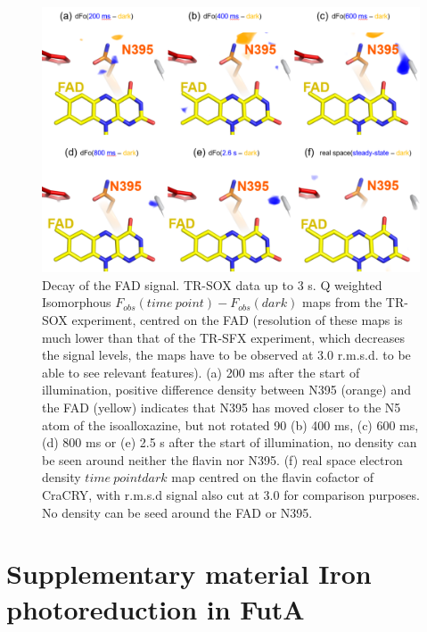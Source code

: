 \begin{figure}[H]
  \centering
  \includegraphics[width=\textwidth]{images/cracry/Supp_fig_FAD_CraCRY-TR-SOX_qFo.pdf}
  \hfill
  \caption{Decay of the FAD signal. TR-SOX data up to 3 s. Q weighted \parencite{bourgeoisNewProcessingTools1999, dezitterXtrapol8EnablesAutomatic2022} Isomorphous \(F_{obs}(time\ point) - F_{obs}(dark)\) maps from the TR-SOX experiment, centred on the FAD (resolution of these maps is much lower than that of the TR-SFX experiment, which decreases the signal levels, the maps have to be observed at 3.0 r.m.s.d. to be able to see relevant features). (a) 200 ms after the start of illumination,  positive difference density between N395 (orange) and the FAD (yellow) indicates that N395 has moved closer to the N5 atom of the isoalloxazine, but not rotated 90 \degree (b) 400 ms, (c) 600 ms, (d) 800 ms or (e) 2.5 s after the start of illumination, no density can be seen around neither the flavin nor N395. (f) real space electron density \(time\ point dark\) map centred on the flavin cofactor of CraCRY, with r.m.s.d signal also cut at 3.0 for comparison purposes. No density can be seed around the FAD or N395.}\label{supfig:TR-SOX_qFo_FAD}
\end{figure}


\section{Supplementary material Iron photoreduction in FutA}

